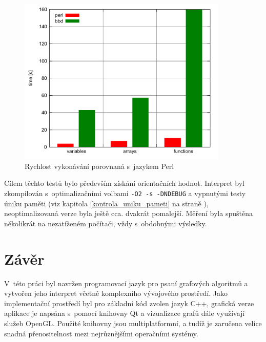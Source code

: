 \documentclass[11pt,twoside,a4paper]{book}
\begin{document}
\begin{figure}[ht]
\begin{center}
\includegraphics[width=10cm]{img/benchmark.pdf}
\caption{Rychlost vykonávání porovnaná s~jazykem Perl}
\label{fig:benchmark}
\end{center}
\end{figure}

Cílem těchto testů bylo především získání orientačních hodnot. Interpret byl zkompilován s~optimalizačními volbami \texttt{-O2 -s -DNDEBUG} a vypnutými testy úniku paměti (viz kapitola \ref{kontrola_uniku_pameti} na straně \pageref{kontrola_uniku_pameti}), neoptimalizovaná verze byla ještě cca. dvakrát pomalejší. Měření byla spuštěna několikrát na nezatíženém počítači, vždy s~obdobnými výsledky.





\chapter{Závěr}


V~této práci byl navržen programovací jazyk pro psaní grafových algoritmů a vytvořen jeho interpret včetně komplexního vývojového prostředí. Jako implementační prostředí byl pro základní kód zvolen jazyk C++, grafická verze aplikace je napsána s~pomocí knihovny Qt a vizualizace grafů dále využívají služeb OpenGL. Použité knihovny jsou multiplatformní, a tudíž je zaručena velice snadná přenositelnost mezi nejrůznějšími operačními systémy.
\end{document}
